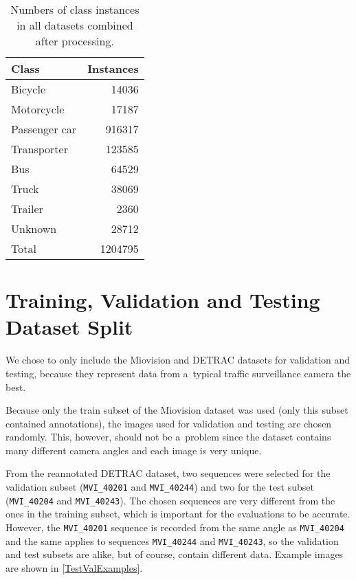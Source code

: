 \begin{table}[t]
    \centering
    \begin{threeparttable}
        \begin{tabular}{|p{4.2cm}|r|}
            \hline
            Class         & Instances \\
            \hline
            Bicycle       &  \num{14036} \\
            Motorcycle    &  \num{17187} \\
            Passenger car & \num{916317} \\
            Transporter   & \num{123585} \\
            Bus           &  \num{64529} \\
            Truck         &  \num{38069} \\
            Trailer       &   \num{2360} \\
            Unknown       &  \num{28712} \\
            \hline
            \hline
            Total         & \num{1204795} \\
            \hline
        \end{tabular}
        \caption{Numbers of class instances in all datasets combined after processing.}
        \label{DatasetsCounts}
    \end{threeparttable}
\end{table}


\section{Training, Validation and Testing Dataset Split}

We chose to only include the Miovision and DETRAC datasets for validation and
testing, because they represent data from a~typical traffic surveillance camera
the best.

Because only the train subset of the Miovision dataset was used (only this
subset contained annotations), the images used for validation and testing are
chosen randomly. This, however, should not be a~problem since the dataset
contains many different camera angles and each image is very unique.

From the reannotated DETRAC dataset, two sequences were selected for the
validation subset (\texttt{MVI\_40201} and \texttt{MVI\_40244}) and two for the
test subset (\texttt{MVI\_40204} and \texttt{MVI\_40243}). The chosen sequences
are very different from the ones in the training subset, which is important for
the evaluations to be accurate. However, the \texttt{MVI\_40201} sequence is
recorded from the same angle as \texttt{MVI\_40204} and the same applies to
sequences \texttt{MVI\_40244} and \texttt{MVI\_40243}, so the validation and
test subsets are alike, but of course, contain different data. Example images
are shown in \autoref{TestValExamples}.

